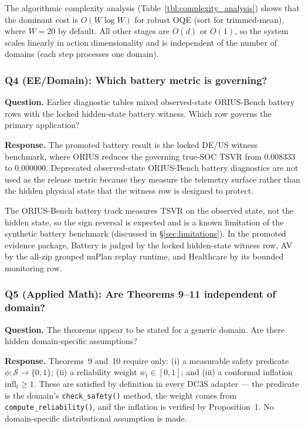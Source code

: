 The algorithmic complexity analysis (Table~\ref{tbl:complexity_analysis}) shows that
the dominant cost is $O(W \log W)$ for robust OQE (sort for trimmed-mean), where
$W = 20$ by default.  All other stages are $O(d)$ or $O(1)$, so the system scales
linearly in action dimensionality and is independent of the number of domains
(each step processes one domain).

\subsubsection*{Q4 (EE/Domain): Which battery metric is governing?}

\textbf{Question.} Earlier diagnostic tables mixed observed-state ORIUS-Bench
battery rows with the locked hidden-state battery witness.  Which row governs
the primary application?

\textbf{Response.}
The promoted battery result is the locked DE/US witness benchmark, where ORIUS
reduces the governing true-SOC TSVR from 0.008333 to 0.000000.  Deprecated
observed-state ORIUS-Bench battery diagnostics are not used as the release
metric because they measure the telemetry surface rather than the hidden physical
state that the witness row is designed to protect.

The ORIUS-Bench battery track measures TSVR on the observed state, not the hidden
state, so the sign reversal is expected and is a known limitation of the synthetic
battery benchmark (discussed in \S\ref{sec:limitations}).  In the promoted
evidence package, Battery is judged by the locked hidden-state witness row, AV by
the all-zip grouped nuPlan replay runtime, and Healthcare by its bounded
monitoring row.

\subsubsection*{Q5 (Applied Math): Are Theorems 9–11 independent of domain?}

\textbf{Question.} The theorems appear to be stated for a generic domain.
Are there hidden domain-specific assumptions?

\textbf{Response.}
Theorems~9 and~10 require only: (i) a measurable safety predicate
$\phi: \mathcal{S} \to \{0,1\}$; (ii) a reliability weight $w_t \in [0,1]$;
and (iii) a conformal inflation $\text{infl}_t \geq 1$.  These are satisfied by
definition in every DC3S adapter — the predicate is the domain's \texttt{check\_safety()}
method, the weight comes from \texttt{compute\_reliability()}, and the inflation is
verified by Proposition~1.  No domain-specific distributional assumption is made.

